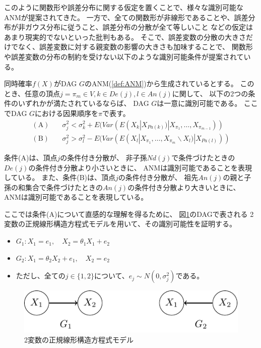 このように関数形や誤差分布に関する仮定を置くことで、様々な識別可能なANMが提案されてきた。
一方で、全ての関数形が非線形であることや、誤差分布が非ガウス分布に従うこと、誤差分布の分散が全て等しいこと
などの仮定はあまり現実的でないといった批判もある。
そこで、誤差変数の分散の大きさだけでなく、誤差変数に対する親変数の影響の大きさも加味することで、
関数形や誤差変数の分布の制約を受けない以下のような識別可能条件が提案されている\cite{Park2020-ey}。

\begin{theo}
  同時確率$f(X)$がDAG $G$のANM(\ref{def:ANM})から生成されているとする。
  このとき、任意の頂点$j = \pi_m \in V, k \in De(j), l \in An(j)$に関して、
  以下の2つの条件のいずれかが満たされているならば、
  DAG $G$は一意に識別可能である。
  ここでDAG $G$における因果順序を$\pi$で表す。
  \begin{align*}
    (\text{A}) \quad &\sigma_j^2 < \sigma_k^2 + E(\mathit{Var}(E(X_k | X_{Pa(k)}) | X_{\pi_1}, \dots, X_{\pi_{m-1}})) \\
    (\text{B}) \quad &\sigma_j^2 > \sigma_l^2 - E(\mathit{Var}(E(X_l | X_{\pi_1}, \dots, X_{\pi_m} \backslash X_l) | X_{Pa(l)}))
  \end{align*}
\end{theo}

条件(A)は、頂点$j$の条件付き分散が、
非子孫$Nd(j)$で条件づけたときの$De(j)$の条件付き分散より小さいときに、
ANMは識別可能であることを表現している。
また、条件(B)は、頂点$j$の条件付き分散が、
祖先$An(j)$の親と子孫の和集合で条件づけたときの$An(j)$の条件付き分散より大きいときに、
ANMは識別可能であることを表現している。

ここでは条件(A)について直感的な理解を得るために、
図\ref{fig:ex_bivariate_SEM}のDAGで表される
2変数の正規線形構造方程式モデルを用いて、その識別可能性を証明する。

\begin{itemize}
  \item
  $G_1 \colon X_1 = e_1,
   \quad X_2 = \theta_1 X_1 + e_2$

  \item
  $G_2 \colon X_1 = \theta_2 X_2 + e_1,
   \quad X_2 = e_2$

  \item
  ただし、全ての$j \in \{ 1,2 \}$について、$e_j \sim N(0, \sigma_j^2)$である。
\end{itemize}

\begin{figure}[h]
  \centering
  \includegraphics{./picture/bivariate_SEM.pdf}
  \caption{2変数の正規線形構造方程式モデル}
  \label{fig:ex_bivariate_SEM}
\end{figure}

